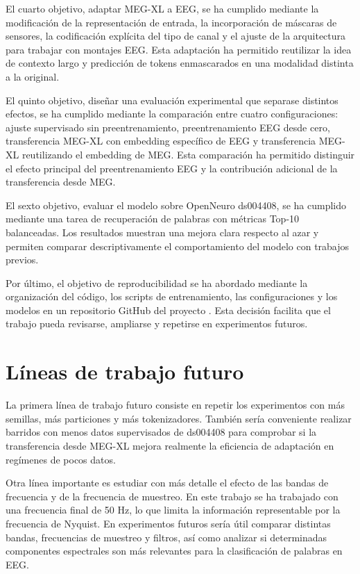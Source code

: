 El cuarto objetivo, adaptar MEG-XL a EEG, se ha cumplido mediante la modificación de la representación de entrada, la incorporación de máscaras de sensores, la codificación explícita del tipo de canal y el ajuste de la arquitectura para trabajar con montajes EEG. Esta adaptación ha permitido reutilizar la idea de contexto largo y predicción de tokens enmascarados en una modalidad distinta a la original.

El quinto objetivo, diseñar una evaluación experimental que separase distintos efectos, se ha cumplido mediante la comparación entre cuatro configuraciones: ajuste supervisado sin preentrenamiento, preentrenamiento EEG desde cero, transferencia MEG-XL con embedding específico de EEG y transferencia MEG-XL reutilizando el embedding de MEG. Esta comparación ha permitido distinguir el efecto principal del preentrenamiento EEG y la contribución adicional de la transferencia desde MEG.

El sexto objetivo, evaluar el modelo sobre OpenNeuro ds004408, se ha cumplido mediante una tarea de recuperación de palabras con métricas Top-10 balanceadas. Los resultados muestran una mejora clara respecto al azar y permiten comparar descriptivamente el comportamiento del modelo con trabajos previos.

Por último, el objetivo de reproducibilidad se ha abordado mediante la organización del código, los scripts de entrenamiento, las configuraciones y los modelos en un repositorio GitHub del proyecto \cite{scrabrain_github}. Esta decisión facilita que el trabajo pueda revisarse, ampliarse y repetirse en experimentos futuros.

\section{Líneas de trabajo futuro}

La primera línea de trabajo futuro consiste en repetir los experimentos con más semillas, más particiones y más tokenizadores. También sería conveniente realizar barridos con menos datos supervisados de ds004408 para comprobar si la transferencia desde MEG-XL mejora realmente la eficiencia de adaptación en regímenes de pocos datos.

Otra línea importante es estudiar con más detalle el efecto de las bandas de frecuencia y de la frecuencia de muestreo. En este trabajo se ha trabajado con una frecuencia final de 50 Hz, lo que limita la información representable por la frecuencia de Nyquist. En experimentos futuros sería útil comparar distintas bandas, frecuencias de muestreo y filtros, así como analizar si determinadas componentes espectrales son más relevantes para la clasificación de palabras en EEG.

